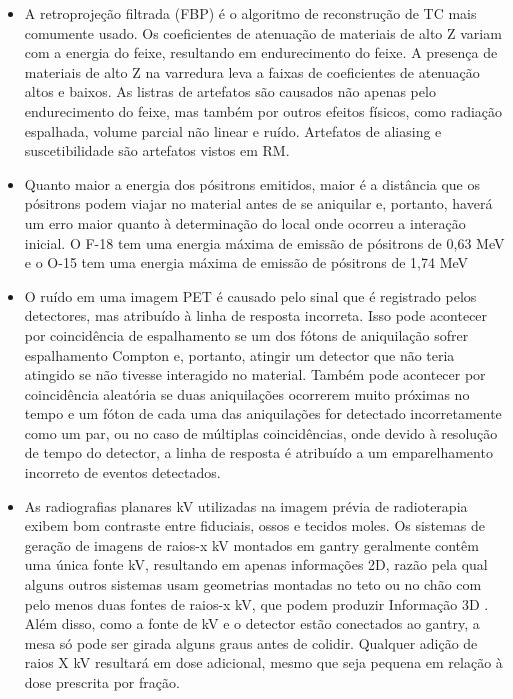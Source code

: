 \documentclass[11pt,a4paper]{article}
\newcounter{exemplo}
\begin{document}
\begin{exemplo}[Imagens]
\begin{itemize}
        \item A retroprojeção filtrada (FBP) é o algoritmo de reconstrução de TC mais comumente usado. Os coeficientes de atenuação de materiais de alto Z variam com a energia do feixe, resultando em endurecimento do feixe. A presença de materiais de alto Z na varredura leva a faixas de coeficientes de atenuação altos e baixos. As listras de artefatos são causados não apenas pelo endurecimento do feixe, mas também por outros efeitos físicos, como radiação espalhada, volume parcial não linear e ruído. Artefatos de aliasing e suscetibilidade são artefatos vistos em RM.
        
        \item Quanto maior a energia dos pósitrons emitidos, maior é a distância que os pósitrons podem viajar no material antes de se aniquilar e, portanto, haverá um erro maior quanto à determinação do local onde ocorreu a interação inicial. O F-18 tem uma energia máxima de emissão de pósitrons de 0,63 MeV e o O-15 tem uma energia máxima de emissão de pósitrons de 1,74 MeV
        
        \item O ruído em uma imagem PET é causado pelo sinal que é registrado pelos detectores, mas atribuído à linha de resposta incorreta. Isso pode acontecer por coincidência de espalhamento se um dos fótons de aniquilação sofrer espalhamento Compton e, portanto, atingir um detector que não teria atingido se não tivesse interagido no material. Também pode acontecer por coincidência aleatória se duas aniquilações ocorrerem muito próximas no tempo e um fóton de cada uma das aniquilações for detectado incorretamente como um par, ou no caso de múltiplas coincidências, onde devido à resolução de tempo do detector, a linha de resposta é atribuído a um emparelhamento incorreto de eventos detectados.
        
        \item As radiografias planares kV utilizadas na imagem prévia de radioterapia exibem bom contraste entre fiduciais, ossos e tecidos moles. Os sistemas de geração de imagens de raios-x kV montados em gantry geralmente contêm uma única fonte kV, resultando em apenas informações 2D, razão pela qual alguns outros sistemas usam geometrias montadas no teto ou no chão com pelo menos duas fontes de raios-x kV, que podem produzir Informação 3D . Além disso, como a fonte de kV e o detector estão conectados ao gantry, a mesa só pode ser girada alguns graus antes de colidir. Qualquer adição de raios X kV resultará em dose adicional, mesmo que seja pequena em relação à dose prescrita por fração.
        

\end{itemize}
\end{exemplo}
\end{document}
